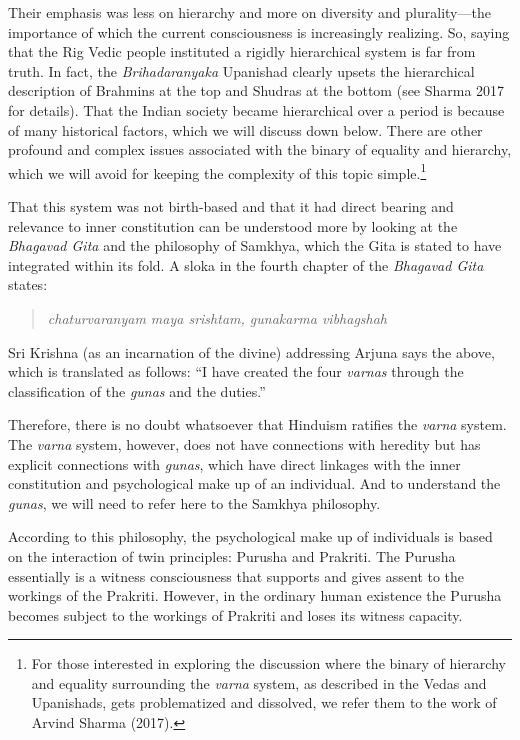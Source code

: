 Their emphasis was less on hierarchy and more on diversity and plurality—the importance of which the current consciousness is increasingly realizing. So, saying that the Rig Vedic people instituted a rigidly hierarchical system is far from truth. In fact, the \textit{Brihadaranyaka} Upanishad clearly upsets the hierarchical description of Brahmins at the top and Shudras at the bottom (see Sharma 2017 for details). That the Indian society became hierarchical over a period is because of many historical factors, which we will discuss down below. There are other profound and complex issues associated with the binary of equality and hierarchy, which we will avoid for keeping the complexity of this topic simple.\footnote{For those interested in exploring the discussion where the binary of hierarchy and equality surrounding the \textit{varna}  	system, as described in the Vedas and Upanishads, gets problematized and dissolved, we refer them to the work of Arvind Sharma (2017).}

That this system was not birth-based and that it had direct bearing and relevance to inner constitution can be understood more by looking at the \textit{Bhagavad Gita} and the philosophy of Samkhya, which the Gita is stated to have integrated within its fold. A sloka in the fourth chapter of the \textit{Bhagavad Gita} states:

\begin{quote}
\textit{chaturvaranyam maya srishtam, gunakarma vibhagshah} 
\end{quote}

Sri Krishna (as an incarnation of the divine) addressing Arjuna says the above, which is translated as follows: “I have created the four \textit{varnas} through the classification of the \textit{gunas} and the duties.”

Therefore, there is no doubt whatsoever that Hinduism ratifies the \textit{varna} system. The \textit{varna} system, however, does not have connections with heredity but has explicit connections with \textit{gunas},  which have direct linkages with the inner constitution and psychological make up of an individual. And to understand the \textit{gunas},  we will need to refer here to the Samkhya philosophy. 

According to this philosophy, the psychological make up of individuals is based on the interaction of twin principles: Purusha  and Prakriti. The Purusha  essentially is a witness consciousness that supports and gives assent to the workings of the Prakriti. However, in the ordinary human existence the Purusha  becomes subject to the workings of Prakriti  and loses its witness capacity. 

